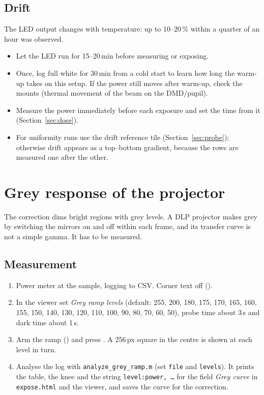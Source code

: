 \documentclass[11pt,a4paper]{article}
\newcommand{\key}[1]{\fbox{\footnotesize\texttt{#1}}}
\newcommand{\file}[1]{\texttt{#1}}
\begin{document}
\subsection{Drift}
The LED output changes with temperature: up to 10--20\,\% within a quarter of an hour was observed.
\begin{itemize}
  \item Let the LED run for 15--20\,min before measuring or exposing.
  \item Once, log full white for 30\,min from a cold start to learn how long the warm-up takes on this setup. If the
        power still moves after warm-up, check the mounts (thermal movement of the beam on the DMD/pupil).
  \item Measure the power immediately before each exposure and set the time from it (Section~\ref{sec:dose}).
  \item For uniformity runs use the drift reference tile (Section~\ref{sec:probe}); otherwise drift appears as a
        top--bottom gradient, because the rows are measured one after the other.
\end{itemize}

\section{Grey response of the projector}
\label{sec:ramp}
The correction dims bright regions with grey levels. A DLP projector makes grey by switching the mirrors on and off
within each frame, and its transfer curve is not a simple gamma. It has to be measured.

\subsection{Measurement}
\begin{enumerate}
  \item Power meter at the sample, logging to CSV. Corner text off (\key{H}).
  \item In the viewer set \emph{Grey ramp levels} (default: 255, 200, 180, 175, 170, 165, 160, 155, 150, 140, 130,
        120, 110, 100, 90, 80, 70, 60, 50), probe time about 3\,s and dark time about 1\,s.
  \item Arm the ramp (\key{R}) and press \key{Space}. A 256\,px square in the centre is shown at each level in turn.
  \item Analyse the log with \file{analyze\_grey\_ramp.m} (set \file{file} and \file{levels}). It prints the table,
        the knee and the string \file{level:power, \ldots} for the field \emph{Grey curve} in \file{expose.html} and the
        viewer, and saves the curve for the correction.
\end{enumerate}
\end{document}
